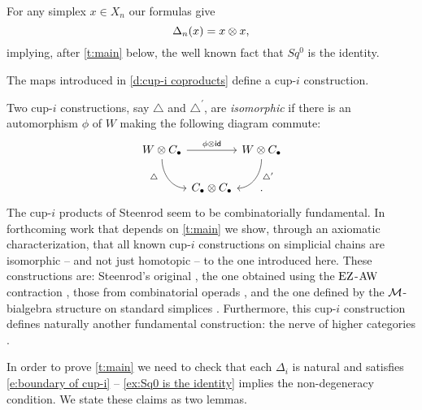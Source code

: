 \begin{example} \label{ex:Sq0 is the identity}
	For any simplex $x \in X_n$ our formulas give
	\begin{equation*}
	\Delta_n(x) = x \otimes x,
	\end{equation*}
	implying, after \cref{t:main} below, the well known fact that $Sq^0$ is the identity.
\end{example}

\begin{theorem} \label{t:main}
	The maps introduced in \cref{d:cup-i coproducts} define a cup-$i$ construction.
\end{theorem}

\begin{remark}
	Two \mbox{cup-$i$} constructions, say $\triangle$ and $\triangle^\prime$, are \textit{isomorphic} if there is an automorphism $\phi$ of $W$ making the following diagram commute:
	\[
	\begin{tikzcd} [column sep = 0, row sep=normal]
	W \ot C_\bullet \arrow[rr, "\phi \ot \id"] \arrow[rd, in=180, out=-90, "\triangle^{\phantom{\prime}}"', near start] & &
	W \ot C_\bullet \arrow[ld, in=0, out=-90, "\triangle^\prime", near start] \\
	& C_\bullet \ot C_\bullet & .
	\end{tikzcd}
	\]
	The cup-$i$ products of Steenrod seem to be combinatorially fundamental.
	In forthcoming work \cite{medina2018axiomatic} that depends on \cref{t:main} we show, through an axiomatic characterization, that all known cup-$i$ constructions on simplicial chains are isomorphic -- and not just homotopic -- to the one introduced here.
	These constructions are: Steenrod's original \cite{steenrod1947products}, the one obtained using the $\operatorname{EZ}$-$\operatorname{AW}$ contraction \cite{real1996computability, gonzalez-diaz1999steenrod}, those from combinatorial operads \cite{mcclure2003multivariable, berger2004combinatorial}, and the one defined by the $\mathcal{M}$-bialgebra structure on standard simplices \cite{medina2020prop1, medina2021prop2}.
	Furthermore, this cup-$i$ construction defines naturally another fundamental construction: the nerve of higher categories \cite{street1987orientals, medina2020globular}.
\end{remark}


In order to prove \cref{t:main} we need to check that each $\Delta_i$ is natural and satisfies \eqref{e:boundary of cup-i} -- \cref{ex:Sq0 is the identity} implies the non-degeneracy condition.
We state these claims as two lemmas.

